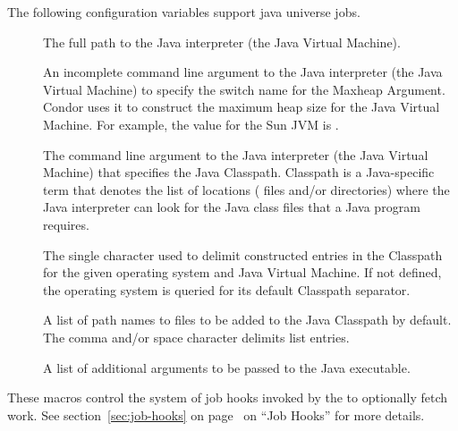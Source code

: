 The following configuration variables support java universe jobs.

\begin{description}
\item[]
\label{param:Java}
  The full path to the Java interpreter (the Java Virtual Machine).

\item[]
\label{param:JavaMaxheapArgument}
  An incomplete command line argument to the Java interpreter
  (the Java Virtual Machine)
  to specify the switch name for the Maxheap Argument.
  Condor uses it to construct the maximum heap size
  for the Java Virtual Machine. 
  For example, the value for the Sun JVM is .

\item[]
\label{param:JavaClasspathArgument}
  The command line argument to the Java interpreter (the Java Virtual Machine)
  that specifies the Java Classpath.
  Classpath is a Java-specific term that denotes the list of
  locations ( files and/or directories)
  where the Java interpreter can
  look for the Java class files that a Java program requires.

\item[]
\label{param:JavaClasspathSeparator}
  The single character used to delimit constructed entries in the
  Classpath for the given operating system and Java Virtual Machine.
  If not defined, the operating system is queried for its default
  Classpath separator.

\item[]
\label{param:JavaClasspathDefault}
  A list of path names to  files to be added to the Java Classpath 
  by default.
  The comma and/or space character delimits list entries.

\item[]
\label{param:JavaExtraArguments}
  A list of additional arguments to be passed to the Java executable.
\end{description}

These macros control the system of job hooks invoked by the
 to optionally fetch work.
See section~\ref{sec:job-hooks} on page~\pageref{sec:job-hooks} on
``Job Hooks'' for more details.

